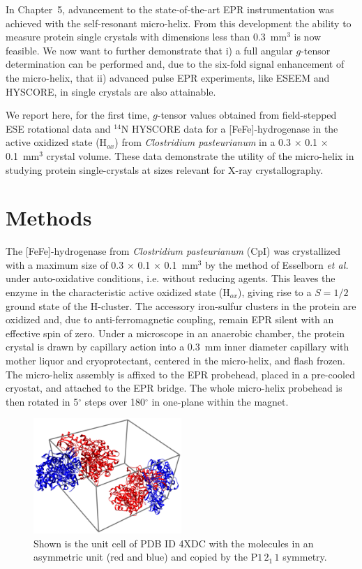 In Chapter~5, advancement to the state-of-the-art EPR instrumentation was achieved with the self-resonant micro-helix. From this development the ability to measure protein single crystals with dimensions less than 0.3~mm$^3$ is now feasible. We now want to further demonstrate that i) a full angular $g$-tensor determination can be performed and, due to the six-fold signal enhancement of the micro-helix, that ii) advanced pulse EPR experiments, like ESEEM and HYSCORE, in single crystals are also attainable. 

We report here, for the first time, $g$-tensor values obtained from field-stepped ESE rotational data and $^{14}$N HYSCORE data for a [FeFe]-hydrogenase in the active oxidized state (H$_{ox}$) from \textit{Clostridium pasteurianum} in a 0.3 $\times$ 0.1 $\times$ 0.1~mm$^3$ crystal volume. These data demonstrate the utility of the micro-helix in studying protein single-crystals at sizes relevant for X-ray crystallography. 

\section{Methods}
The [FeFe]-hydrogenase from \textit{Clostridium pasteurianum} (CpI) was crystallized with a maximum  size of 0.3 $\times$ 0.1 $\times$ 0.1~mm$^3$ by the method of Esselborn \textit{et al.}\cite{FeFeCry} under auto-oxidative conditions, i.e. without reducing agents. This leaves the enzyme in the characteristic active oxidized state (H$_{ox}$), giving rise to a $S=1/2$ ground state of the H-cluster. The accessory iron-sulfur clusters in the protein are oxidized and, due to anti-ferromagnetic coupling, remain EPR silent with an effective spin of zero. \cite{lubitzhyd}  Under a microscope in an anaerobic chamber, the protein crystal is drawn by capillary action into a 0.3~mm inner diameter capillary with mother liquor and cryoprotectant, centered in the micro-helix, and flash frozen. The micro-helix assembly is affixed to the EPR probehead, placed in a pre-cooled cryostat, and attached to the EPR bridge. The whole micro-helix probehead is then rotated in 5$^{\circ}$ steps over 180$^{\circ}$ in one-plane within the magnet. 

\begin{figure}[htbp]
\centering
 \includegraphics[width=0.5\textwidth]{Kapitel/Ch6-Images/Ch6-UnitCell.eps}
 \caption[Unit Cell from PDB 4XDC.]{Shown is the unit cell of PDB ID 4XDC with the molecules in an asymmetric unit (red and blue) and copied by the P$1\,2_1\,1$ symmetry.} 
 \label{fig:xTalFeFeUnit}
\end{figure}

